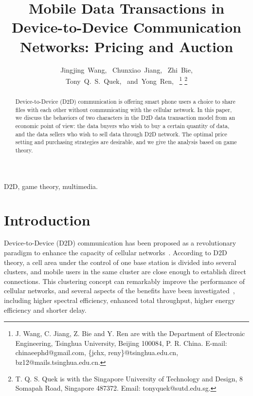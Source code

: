 \documentclass[11pt,draftcls]{IEEEtran}{\onecolumn}
\begin{document}
%
\title{Mobile Data Transactions in Device-to-Device Communication Networks: Pricing and Auction}

\author{Jingjing~Wang,~
        Chunxiao~Jiang,~
        Zhi~Bie,\\
        Tony~Q.~S.~Quek,~
        and~Yong~Ren,~
\thanks{J. Wang, C. Jiang, Z. Bie and Y. Ren are with the Department
of Electronic  Engineering, Tsinghua University, Beijing 100084,
P. R. China. E-mail: chinaeephd@gmail.com, \{jchx, reny\}@tsinghua.edu.cn, bz12@mails.tsinghua.edu.cn.}
\thanks{T. Q. S. Quek is with the Singapore University of Technology and Design, 8 Somapah Road, Singapore 487372. Email: tonyquek@sutd.edu.sg.}
}
\maketitle


\begin{abstract}
Device-to-Device (D2D) communication is offering smart phone users a choice to share files with each other without communicating with the cellular network. In this paper, we discuss the behaviors of two characters in the D2D data transaction model from an economic point of view: the data buyers who wish to buy a certain quantity of data, and the data sellers who wish to sell data through D2D network. The optimal price setting and purchasing strategies are desirable, and we give the analysis based on game theory.
\end{abstract}

\begin{IEEEkeywords}
D2D, game theory, multimedia.
\end{IEEEkeywords}

\IEEEpeerreviewmaketitle

\section{Introduction}
Device-to-Device (D2D) communication has been proposed as a revolutionary paradigm to enhance the capacity of cellular networks~\cite{1}.
According to D2D theory, a cell area under the control of one base station is divided into several clusters, and mobile users in the same cluster are close enough to establish direct connections. This clustering concept can remarkably improve the performance of cellular networks, and  several aspects of the benefits have been investigated~\cite{2}, including higher spectral efficiency, enhanced total throughput, higher energy efficiency and shorter delay.
\end{document}

